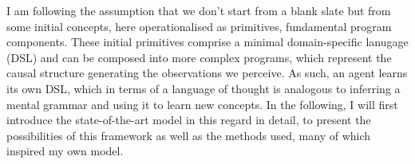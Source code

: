 













I am following the assumption that we don't start from a blank slate but from some initial concepts, here operationalised as primitives, fundamental program components. These initial primitives comprise a minimal domain-specific lanugage (DSL) and can be composed into more complex programs, which represent the causal structure generating the observations we perceive. As such, an agent learns its own DSL, which in terms of a language of thought is analogous to inferring a mental grammar and using it to learn new concepts.
In the following, I will first introduce the state-of-the-art model in this regard in detail, to present the possibilities of this framework as well as the methods used, many of which inspired my own model.
